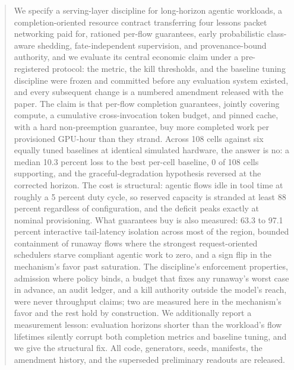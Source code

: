 \begin{abstract}
We specify a serving-layer discipline for long-horizon agentic
workloads, a completion-oriented resource contract transferring four
lessons packet networking paid for, rationed per-flow guarantees, early
probabilistic class-aware shedding, fate-independent supervision, and
provenance-bound authority, and we evaluate its central economic claim
under a pre-registered protocol: the metric, the kill thresholds, and
the baseline tuning discipline were frozen and committed before any
evaluation system existed, and every subsequent change is a numbered
amendment released with the paper. The claim is that per-flow completion
guarantees, jointly covering compute, a cumulative cross-invocation
token budget, and pinned cache, with a hard non-preemption guarantee,
buy more completed work per provisioned GPU-hour than they strand.
Across 108 cells against six equally tuned baselines at identical
simulated hardware, the answer is no: a median 10.3 percent loss to the
best per-cell baseline, 0 of 108 cells supporting, and the
graceful-degradation hypothesis reversed at the corrected horizon. The
cost is structural: agentic flows idle in tool time at roughly a 5
percent duty cycle, so reserved capacity is stranded at least 88 percent
regardless of configuration, and the deficit peaks exactly at nominal
provisioning. What guarantees buy is also measured: 63.3 to 97.1 percent
interactive tail-latency isolation across most of the region, bounded
containment of runaway flows where the strongest request-oriented
schedulers starve compliant agentic work to zero, and a sign flip in the
mechanism's favor past saturation. The discipline's enforcement
properties, admission where policy binds, a budget that fixes any
runaway's worst case in advance, an audit ledger, and a kill authority
outside the model's reach, were never throughput claims; two are
measured here in the mechanism's favor and the rest hold by
construction. We additionally report a measurement lesson: evaluation
horizons shorter than the workload's flow lifetimes silently corrupt
both completion metrics and baseline tuning, and we give the structural
fix. All code, generators, seeds, manifests, the amendment history, and
the superseded preliminary readouts are released.
\end{abstract}
